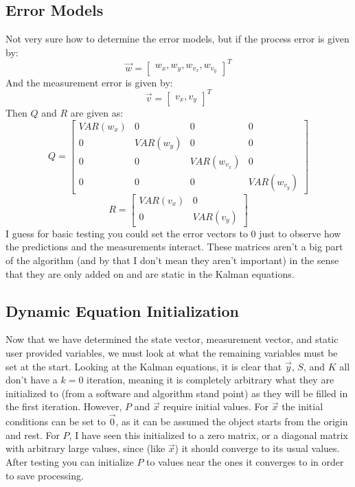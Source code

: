 \documentclass{article} %
\begin{document}
\subsection{Error Models}
Not very sure how to determine the error models, but if the process error is given by:
\begin{equation}
\vec{w} = 
\begin{bmatrix}
 w_x, w_y, w_{v_x}, w_{v_y}
\end{bmatrix}^T
\end{equation}
And the measurement error is given by:
\begin{equation}
\vec{v} = 
\begin{bmatrix}
 v_x, v_y
\end{bmatrix}^T
\end{equation}
Then $Q$ and $R$ are given as:
\begin{equation}
Q =
\begin{bmatrix}
VAR(w_x) & 0 & 0 & 0 \\
0 & VAR(w_y) & 0 & 0 \\
0 & 0 & VAR(w_{v_x}) & 0 \\
0 & 0 & 0 & VAR(w_{v_y}) 
\end{bmatrix}
\end{equation}
\begin{equation}
R =
\begin{bmatrix}
VAR(v_x) & 0 \\
0 & VAR(v_y) 
\end{bmatrix}
\end{equation}
I guess for basic testing you could set the error vectors to 0 just to observe how the predictions and the measurements interact. These matrices aren't a big part of the algorithm (and by that I don't mean they aren't important) in the sense that they are only added on and are static in the Kalman equations.
\subsection{Dynamic Equation Initialization}
Now that we have determined the state vector, measurement vector, and static user provided variables, we must look at what the remaining variables must be set at the start. Looking at the Kalman equations, it is clear that $\vec{y}$, $S$, and $K$ all don't have a $k = 0$ iteration, meaning it is completely arbitrary what they are initialized to (from a software and algorithm stand point) as they will be filled in the first iteration. However, $P$ and $\vec{x}$ require initial values. For $\vec{x}$ the initial conditions can be set to $\vec{0}$, as it can be assumed the object starts from the origin and rest. For $P$, I have seen this initialized to a zero matrix, or a diagonal matrix with arbitrary large values, since (like $\vec{x}$) it should converge to its usual values. After testing you can initialize $P$ to values near the ones it converges to in order to save processing.
\end{document}
